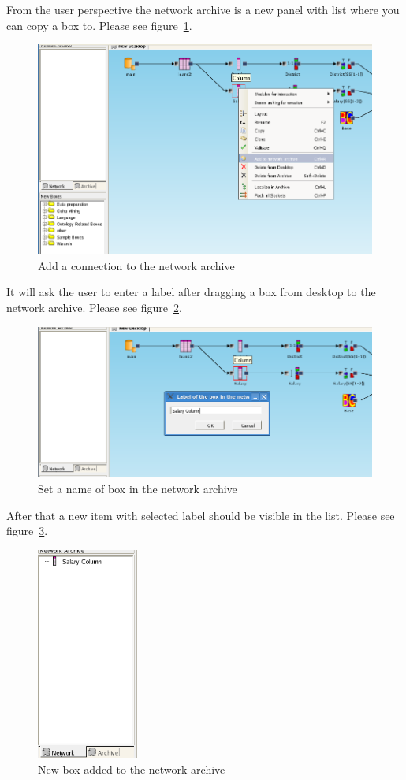 \documentclass[a4paper,12pt]{book}
\begin{document}
From the user perspective the network archive is a new panel with list where you can copy a box to. Please see figure~\ref{fig:addToNA}. 
\begin{figure}
	\includegraphics[width=1\textwidth]{add_to_network_archive}
	\caption{Add a connection to the network archive}
	\label{fig:addToNA}
\end{figure}

It will ask the user to enter a label after dragging a box from desktop to the network archive. Please see figure~\ref{fig:setNameInNA}.
\begin{figure}
	\includegraphics[width=1\textwidth]{set_name_of_box_in_network_archive}
	\caption{Set a name of box in the network archive}
	\label{fig:setNameInNA}
\end{figure}

After that a new item with selected label should be visible in the list. Please see figure~\ref{fig:addedToNA}.
\begin{figure}
	\centering
	\includegraphics[height=7cm]{network_archive_box_added}
	\caption{New box added to the network archive}
	\label{fig:addedToNA}
\end{figure}
\end{document}
